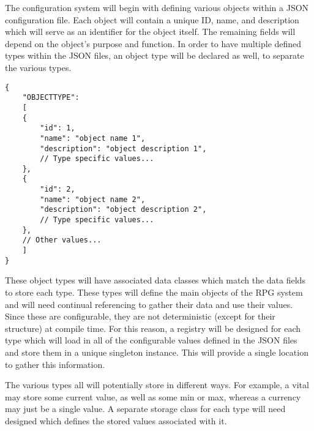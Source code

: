 The configuration system will begin with defining various objects within a JSON configuration file. Each object will contain a unique ID, name, and description which will serve as an identifier for the object itself. The remaining fields will depend on the object's purpose and function. In order to have multiple defined types within the JSON files, an object type will be declared as well, to separate the various types. 
\begin{lstlisting}[style=htmlstyle]
{
	"OBJECTTYPE": 
	[
	{
		"id": 1,
		"name": "object name 1",
		"description": "object description 1",
		// Type specific values...
	},
	{
		"id": 2,
		"name": "object name 2",
		"description": "object description 2",
		// Type specific values...
	},
	// Other values...
	]
}
\end{lstlisting}
These object types will have associated data classes which match the data fields to store each type. These types will define the main objects of the RPG system and will need continual referencing to gather their data and use their values. Since these are configurable, they are not deterministic (except for their structure) at compile time. For this reason, a registry will be designed for each type which will load in all of the configurable values defined in the JSON files and store them in a unique singleton instance. This will provide a single location to gather this information.

The various types all will potentially store in different ways. For example, a vital may store some current value, as well as some min or max, whereas a currency may just be a single value. A separate storage class for each type will need designed which defines the stored values associated with it.














